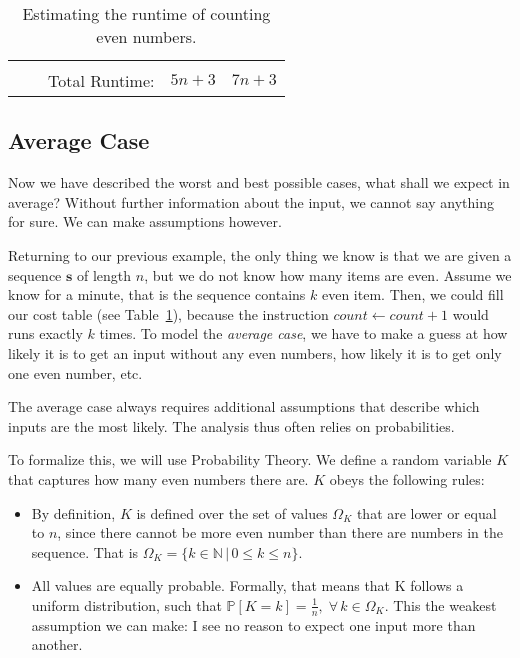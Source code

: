 \documentclass{aldast}
\begin{document}
\begin{table}[htbp]
\begin{center}
\begin{tabular}{lcc c cc}
      \hline                                                                                                                                                 \\[-3mm]
                                                                 &                          & \multicolumn{2}{c}{Total Runtime:} & $5n+3$ & $7n+3$           \\
      \bottomrule
    \end{tabular}
  \end{center}
  \caption{Estimating the runtime of counting even numbers.}
  \label{tab:count-even}
\end{table}


\subsection{Average Case}

Now we have described the worst and best possible cases, what
shall we expect in average? Without further information about the
input, we cannot say anything for sure. We can make assumptions
however.

Returning to our previous example, the only thing we know is that we
are given a sequence $\mathbf{s}$ of length $n$, but we do not know
how many items are even. Assume we know for a minute, that is the
sequence contains $k$ even item. Then, we could fill our cost table
(see Table~\ref{tab:count-even}), because the instruction
$count \gets count + 1$ would runs exactly $k$ times. To model the
\emph{average case}, we have to make a guess at how likely it is to
get an input without any even numbers, how likely it is to get only
one even number, etc.

\begin{takeaway}
  The average case always requires additional assumptions that
  describe which inputs are the most likely. The analysis thus often
  relies on probabilities.
\end{takeaway}

To formalize this, we will use Probability Theory. We define a random
variable $K$ that captures how many even numbers there are. $K$ obeys
the following rules:
\begin{itemize}
\item By definition, $K$ is defined over the set of values $\Omega_K$
  that are lower or equal to $n$, since there cannot be more even
  number than there are numbers in the sequence. That is
  $\Omega_K =\{ k \in \mathbb{N} \, | \, 0 \leq k \leq n \}$.
\item All values are equally probable. Formally, that means that K
  follows a uniform distribution, such that
  $\mathbb{P}[K=k] = \frac{1}{n}, \; \forall \, k \in \Omega_K$. This
  the weakest assumption we can make: I see no reason to expect one
  input more than another.
\end{itemize}
\end{document}
